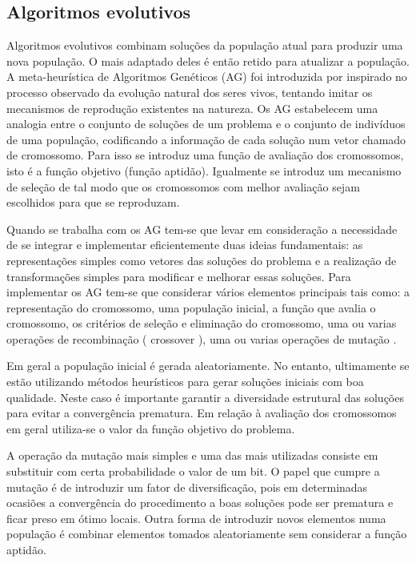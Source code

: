 \subsection{Algoritmos evolutivos}

Algoritmos evolutivos combinam soluções da população atual para produzir uma nova população. O mais adaptado deles é então retido para atualizar a população. A meta-heurística de Algoritmos Genéticos (AG) foi introduzida por \cite{holland75} inspirado no processo observado da evolução natural dos seres vivos, tentando imitar os mecanismos de reprodução existentes na natureza. Os AG estabelecem uma analogia entre o conjunto de soluções de um problema e o conjunto de indivíduos de uma população, codificando a informação de cada solução num vetor chamado de cromossomo. Para isso se introduz uma função de avaliação dos cromossomos, isto é a função objetivo (função aptidão). Igualmente se introduz um mecanismo de seleção de tal modo que os cromossomos com melhor avaliação sejam escolhidos para que se reproduzam. 

Quando se trabalha com os AG tem-se que levar em consideração a necessidade de se integrar e implementar eficientemente duas ideias fundamentais: as representações simples como vetores das soluções do problema e a realização de transformações simples para modificar e melhorar essas soluções. Para implementar os AG tem-se que considerar vários elementos principais tais como: a representação do cromossomo, uma população inicial, a função que avalia o cromossomo, os critérios de seleção e eliminação do cromossomo, uma ou varias operações de recombinação ( crossover ), uma ou varias operações de mutação . 


Em geral a população inicial é gerada aleatoriamente. No entanto, ultimamente se estão utilizando métodos heurísticos para gerar soluções iniciais com boa qualidade. Neste caso é importante garantir a diversidade estrutural das soluções para evitar a convergência prematura. Em relação à avaliação dos cromossomos em geral utiliza-se o valor da função objetivo do problema. 

A operação da mutação mais simples e uma das mais utilizadas consiste em substituir com certa probabilidade o valor de um bit. O papel que cumpre a mutação é de introduzir um fator de diversificação, pois em determinadas ocasiões a convergência do procedimento a boas soluções pode ser prematura e ficar preso em ótimo locais. Outra forma de introduzir novos elementos numa população é combinar elementos tomados aleatoriamente sem considerar a função aptidão. 
 
